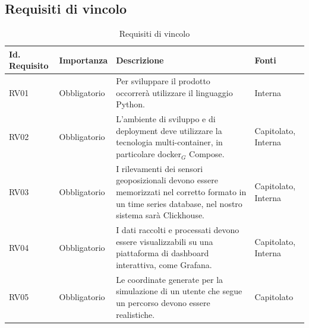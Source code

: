 \documentclass[11pt]{article}
\begin{document}
\begin{justify}
\subsection{Requisiti di vincolo}

\begin{table}[H]
\centering
\renewcommand{\arraystretch}{1.5}
\begin{tabular}{|>{\centering\arraybackslash}m{2.7cm}|>{\centering\arraybackslash}m{2.7cm}|>{\centering\arraybackslash}m{6cm}|>{\centering\arraybackslash}m{2.1cm}|}
\hline
\textbf{Id. Requisito} & \textbf{Importanza} & \textbf{Descrizione} & \textbf{Fonti}\\
\hline
RV01 & Obbligatorio &  Per sviluppare il prodotto occorrerà utilizzare il linguaggio Python. & Interna\\
\hline 
RV02 & Obbligatorio & L'ambiente di sviluppo e di deployment deve utilizzare la tecnologia multi-container, in particolare docker$_G$ Compose. & Capitolato, Interna\\
\hline
RV03 & Obbligatorio & I rilevamenti dei sensori geoposizionali
devono essere memorizzati nel corretto formato in un time series database, nel nostro sistema sarà Clickhouse. & Capitolato, Interna \\
\hline
RV04 & Obbligatorio & I dati raccolti e processati devono essere visualizzabili su una piattaforma di dashboard interattiva, come Grafana. & Capitolato, Interna\\
\hline
RV05 & Obbligatorio & Le coordinate generate per la simulazione di un utente che segue un percorso devono essere realistiche. & Capitolato\\
\hline
\end{tabular}

\caption{Requisiti di vincolo}
\end{table}


\newpage

\end{justify}
\end{document}
